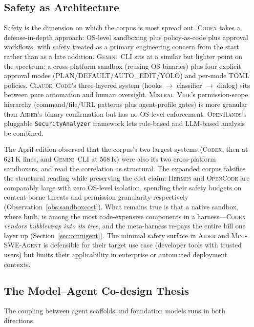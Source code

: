 \documentclass[11pt,a4paper]{article}
\newcommand{\clcode}{\textsc{Claude~Code}\xspace}
\newcommand{\cdx}{\textsc{Codex}\xspace}
\newcommand{\oh}{\textsc{OpenHands}\xspace}
\newcommand{\adr}{\textsc{Aider}\xspace}
\newcommand{\mswe}{\textsc{Mini-SWE-Agent}\xspace}
\newcommand{\vibe}{\textsc{Mistral~Vibe}\xspace}
\newcommand{\gemini}{\textsc{Gemini~CLI}\xspace}
\newcommand{\hrm}{\textsc{Hermes}\xspace}
\newcommand{\ocd}{\textsc{OpenCode}\xspace}
\begin{document}
\subsection{Safety as Architecture}

Safety is the dimension on which the corpus is most spread out.
\cdx{} takes a defense-in-depth approach: OS-level sandboxing plus policy-as-code plus approval workflows, with safety treated as a primary engineering concern from the start rather than as a late addition.
\gemini{} sits at a similar but lighter point on the spectrum: a cross-platform sandbox (reusing OS binaries) plus four explicit approval modes (PLAN/DEFAULT/AUTO\_EDIT/YOLO) and per-mode TOML policies.
\clcode{}'s three-layered system (hooks $\to$ classifier $\to$ dialog) sits between pure automation and human oversight.
\vibe{}'s permission-scope hierarchy (command/file/URL patterns plus agent-profile gates) is more granular than \adr{}'s binary confirmation but has no OS-level enforcement.
\oh{}'s pluggable \texttt{SecurityAnalyzer} framework lets rule-based and LLM-based analysis be combined.

The April edition observed that the corpus's two largest systems (\cdx{}, then at 621\,K lines, and \gemini{} at 568\,K) were also its two cross-platform sandboxers, and read the correlation as structural.
The expanded corpus falsifies the structural reading while preserving the cost claim: \hrm{} and \ocd{} are comparably large with zero OS-level isolation, spending their safety budgets on content-borne threats and permission granularity respectively (Observation~\ref{obs:sandboxcost}).
What remains true is that a native sandbox, where built, is among the most code-expensive components in a harness---\cdx{} \emph{vendors bubblewrap into its tree}, and the meta-harness re-pays the entire bill one layer up (Section~\ref{sec:omnigent}).
The minimal safety surface in \adr{} and \mswe{} is defensible for their target use case (developer tools with trusted users) but limits their applicability in enterprise or automated deployment contexts.

\subsection{The Model--Agent Co-design Thesis}

The coupling between agent scaffolds and foundation models runs in both directions.
\end{document}
